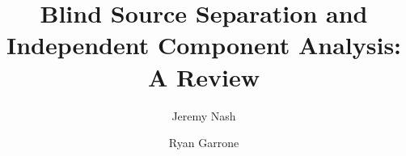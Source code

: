 \title{Blind Source Separation and Independent Component Analysis: A Review}
\author[add]{Jeremy Nash}
\author[add]{Ryan Garrone}
\address[add]{Electrical Engineering Division, University of Michigan, Ann Arbor, MI 48109}
